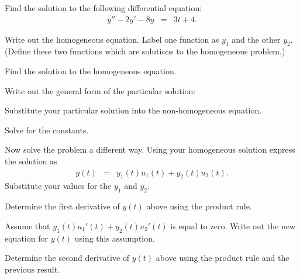   \begin{problem}
  \item Find the solution to the following differential equation:
    \begin{eqnarray}
      y'' - 2y' - 8y & = & 3t + 4.
      \label{eqn:secondOrderExample}
    \end{eqnarray}
    \begin{subproblem}
    \item Write out the homogeneous equation. Label one function as
      $y_1$ and the other $y_2$. (Define these two functions which are
      solutions to the homogeneous problem.)
      \vspace{2em}
    \item Find the solution to the homogeneous equation.
      \vfill

    \clearpage

  \item Write out the general form of the particular solution:
    \vspace{4em}

  \item Substitute your particular solution into the non-homogeneous equation.
    \vfill

  \item Solve for the constants.
    \vfill

    \clearpage

    \item Now solve the problem a different way. Using your
      homogeneous solution express the solution as 
      \begin{eqnarray*}
        y(t) & = & y_1(t) u_1(t) + y_2(t) u_2(t).
      \end{eqnarray*}
      Substitute your values for the $y_1$ and $y_2$. 

      \vspace{2em}

    \item Determine the first derivative of $y(t)$ above using the
      product rule.

      \vfill

    \item Assume that $y_1(t) u_1'(t) + y_2(t) u_2'(t)$ is equal to
      zero. Write out the new equation for $y(t)$ using this
      assumption.

      \vfill

    \item Determine the second derivative of $y(t)$ above using the
      product rule and the previous result.


\end{subproblem}
\end{problem}
